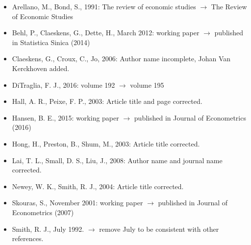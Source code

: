 \documentclass[11pt]{article}
\begin{document}
\begin{itemize}
\item Arellano, M., Bond, S., 1991: The review of economic studies $\rightarrow$ The Review of Economic Studies
\item Behl, P., Claeskens, G., Dette, H., March 2012: working paper $\rightarrow$ published in Statistica Sinica (2014)
\item Claeskens, G., Croux, C., Jo, 2006: Author name incomplete,  Johan Van Kerckhoven added.
\item DiTraglia, F. J., 2016: volume 192 $\rightarrow$ volume 195
\item Hall, A. R., Peixe, F. P., 2003: Article title and page corrected.
\item Hansen, B. E., 2015: working paper $\rightarrow$ published in Journal of Econometrics (2016)
\item Hong, H., Preston, B., Shum, M., 2003: Article title corrected.
\item Lai, T. L., Small, D. S., Liu, J., 2008: Author name and journal name corrected.
\item Newey, W. K., Smith, R. J., 2004: Article title corrected.
\item Skouras, S., November 2001: working paper $\rightarrow$ published in Journal of Econometrics (2007)
\item Smith, R. J., July 1992. $\rightarrow$ remove July to be consistent with other references.
\end{itemize}
\end{document}

